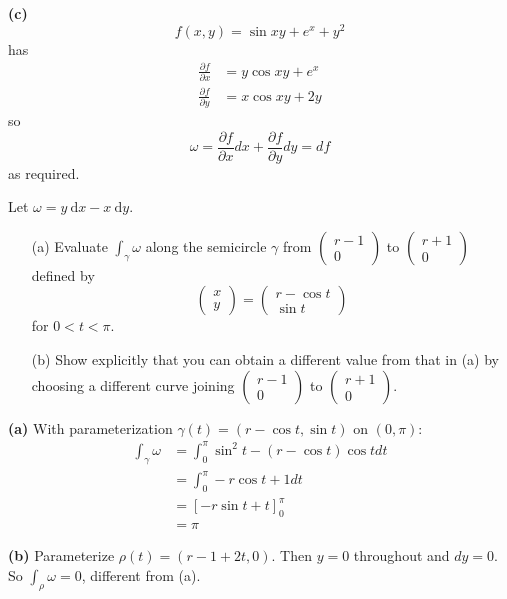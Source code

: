 \documentclass[a4paper, 12pt]{article}
\begin{document}
\begin{solution}
    \textbf{(c)} \[
    f(x, y) = \sin xy + e^x + y^2
    \]
    has \begin{align*}
    \frac{\partial f}{\partial x} &= y \cos xy + e^x \\
    \frac{\partial f}{\partial y} &= x \cos xy + 2y
    \end{align*}
    so \[
    \omega = \frac{\partial f}{\partial x}dx + \frac{\partial f}{\partial y} dy = df
    \]
    as required.
\end{solution}

\begin{problem} 
Let $\omega=y \mathrm{~d} x-x \mathrm{~d} y$.

\begin{enumerate}
    \item[(a)] Evaluate $\int_\gamma \omega$ along the semicircle $\gamma$ from $\begin{pmatrix} r -1 \\ 0\end{pmatrix}$ to $\begin{pmatrix} r+1 \\ 0\end{pmatrix}$ defined by
        \[
            \begin{pmatrix}
                x \\
                y
            \end{pmatrix}=\begin{pmatrix}{r}
                -\cos t \\
                \sin t
            \end{pmatrix}
        \]
        for $0<t<\pi$.
    \item[(b)] Show explicitly that you can obtain a different value from that in (a) by choosing a different curve joining $\begin{pmatrix}{r}-1 \\ 0\end{pmatrix}$ to $\begin{pmatrix} r + 1 \\ 0\end{pmatrix}$.
\end{enumerate}
\end{problem}
\begin{solution}
    \textbf{(a)} With parameterization $\gamma(t) = (r - \cos t, \sin t)$ on $(0, \pi)$:
    \begin{align*}
    \int_{\gamma} \omega &= \int_{0}^\pi \sin^2 t - (r - \cos t) \cos t dt \\
    &= \int_{0}^{\pi} -r \cos t + 1 dt\\
    &= \left[-r \sin t + t\right]_0^\pi \\
    &= \pi
    \end{align*}

    \textbf{(b)} Parameterize $\rho(t) = (r - 1 + 2t, 0)$. Then $y = 0$ throughout and $dy = 0$. So $\int_{\rho} \omega = 0$, different from (a).
\end{solution}
\end{document}
